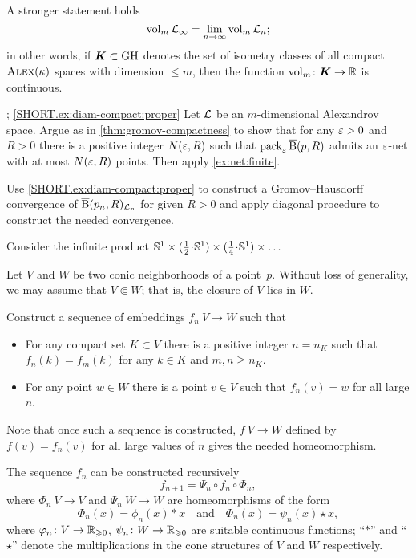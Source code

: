 
A stronger statement holds 
\[\operatorname{\rm vol}\nolimits_m\mathcal{L}_\infty=\lim_{n\to\infty} \operatorname{\rm vol}\nolimits_m\mathcal{L}_n;\]
in other words, if $\bm{K}\subset \operatorname{\rm GH}\nolimits$ denotes the set of isometry classes of all compact $\textsc{Alex}(\kappa)$ spaces with dimension $\le m$, then the function
$\operatorname{\rm vol}\nolimits_m\colon\bm{K}\to \mathbb{R}$ is continuous.

\parbf{\ref{ex:diam-compact}}; \ref{SHORT.ex:diam-compact:proper}
Let $\mathcal{L}$ be an $m$-dimensional Alexandrov space.
Argue as in \ref{thm:gromov-compactness} to show that for any $\varepsilon>0$ and $R>0$ 
there is a positive integer $N(\varepsilon,R)$ such that 
$\operatorname{\rm pack}\nolimits_\varepsilon \overline{\mathrm{B}}{}(p,R)$ admits an $\varepsilon$-net with at most $N(\varepsilon,R)$ points.
Then apply \ref{ex:net:finite}.

Use \ref{SHORT.ex:diam-compact:proper} to construct a Gromov--Hausdorff convergence of $\overline{\mathrm{B}}{}(p_n,R)_{\mathcal{L}_n}$ for given $R>0$ and apply diagonal procedure to construct the needed convergence.

Consider the infinite product $\SSS^1\times ({\tfrac 12}\cdot \SSS^1)\times ({\tfrac 14}\cdot \SSS^1)\times\dots$

Let $V$ and $W$ be two conic neighborhoods of a point~$p$.
Without loss of generality, we may assume that $V\Subset W$;
that is, the closure of $V$ lies in $W$.

Construct a sequence of embeddings $f_n\:V\to W$
such that 
\begin{itemize}
\item 
For any compact set $K\subset V$ 
there is a positive integer $n=n_K$ such that 
$f_n(k)=f_m(k)$ for any $k\in K$ and $m, n \ge n_K$.
\item For any point $w\in W$ there is a point $v\in V$ such that $f_n(v)=w$ for all large $n$.
\end{itemize}

Note that once such a sequence is constructed, $f\:V\to W$ defined by $f(v)=f_n(v)$ for all large values of $n$ gives the needed homeomorphism.

The sequence $f_n$ can be constructed recursively
\[f_{n+1}=\Psi_n\circ f_n\circ \Phi_n,\]
where $\Phi_n\:V\to V$ 
and $\Psi_n\:W\to W$ 
are homeomorphisms
of the form 
\[\Phi_n(x)=\phi_n(x)\ast x\quad \text{and}\quad \Phi_n(x)=\psi_n(x)\star x,\]
where $\varphi_n\colon V\to \mathbb{R}_{\geqslant 0}$, $\psi_n\colon W\to \mathbb{R}_{\geqslant 0}$ are suitable continuous functions;
``$\ast$'' and ``$\star$'' denote the multiplications in the cone structures of $V$ and $W$ respectively.

